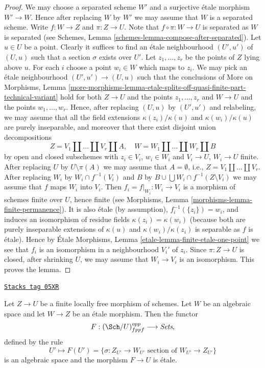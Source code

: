 \begin{proof}
We may choose a separated scheme $W'$ and a surjective \'etale morphism
$W' \to W$. Hence after replacing $W$ by $W'$ we may assume that $W$
is a separated scheme. Write $f : W \to Z$ and $\pi : Z \to U$.
Note that $f \circ \pi : W \to U$ is separated as
$W$ is separated (see
Schemes, Lemma \ref{schemes-lemma-compose-after-separated}).
Let $u \in U$ be a point. Clearly it suffices
to find an \'etale neighbourhood $(U', u')$ of $(U, u)$ such that
a section $\sigma$ exists over $U'$. Let $z_1, \ldots, z_r$
be the points of $Z$ lying above $u$. For each $i$ choose a point
$w_i \in W$ which maps to $z_i$. We may pick an \'etale neighbourhood
$(U', u') \to (U, u)$ such that the conclusions of
More on Morphisms, Lemma
\ref{more-morphisms-lemma-etale-splits-off-quasi-finite-part-technical-variant}
hold for both $Z \to U$ and the points $z_1, \ldots, z_r$
and $W \to U$ and the points $w_1, \ldots, w_r$. Hence, after
replacing $(U, u)$ by $(U', u')$ and relabeling, we may assume that
all the field extensions $\kappa(z_i)/\kappa(u)$ and
$\kappa(w_i)/\kappa(u)$ are purely inseparable, and moreover
that there exist disjoint union decompositions
$$
Z = V_1 \amalg \ldots \amalg V_r \amalg A, \quad
W = W_1 \amalg \ldots \amalg W_r \amalg B
$$
by open and closed subschemes
with $z_i \in V_i$, $w_i \in W_i$ and $V_i \to U$, $W_i \to U$ finite.
After replacing $U$ by $U \setminus \pi(A)$ we may assume that
$A = \emptyset$, i.e., $Z = V_1 \amalg \ldots \amalg V_r$.
After replacing $W_i$ by $W_i \cap f^{-1}(V_i)$ and
$B$ by $B \cup \bigcup W_i \cap f^{-1}(Z \setminus V_i)$
we may assume that $f$ maps $W_i$ into $V_i$.
Then $f_i = f|_{W_i} : W_i \to V_i$ is a morphism of schemes finite over $U$,
hence finite (see
Morphisms, Lemma \ref{morphisms-lemma-finite-permanence}).
It is also \'etale (by assumption),
$f_i^{-1}(\{z_i\}) = w_i$, and induces an isomorphism of residue
fields $\kappa(z_i) = \kappa(w_i)$ (because both are purely inseparable
extensions of $\kappa(u)$ and $\kappa(w_i)/\kappa(z_i)$
is separable as $f$ is \'etale). Hence by
\'Etale Morphisms, Lemma \ref{etale-lemma-finite-etale-one-point}
we see that $f_i$ is an isomorphism in a neighbourhood $V_i'$ of
$z_i$. Since $\pi : Z \to U$ is closed, after shrinking $U$, we may assume
that $W_i \to V_i$ is an isomorphism. This proves the lemma.
\end{proof}

\begin{lemma}
\label{criteria-lemma-space-of-sections}
\href{https://stacks.math.columbia.edu/tag/05XR}{\texttt{Stacks tag 05XR}}

Let $Z \to U$ be a finite locally free morphism of schemes.
Let $W$ be an algebraic space and let $W \to Z$ be an \'etale morphism.
Then the functor
$$
F : (\Sch/U)_{fppf}^{opp} \longrightarrow \textit{Sets},
$$
defined by the rule
$$
U' \longmapsto
F(U') =
\{\sigma : Z_{U'} \to W_{U'}\text{ section of }W_{U'} \to Z_{U'}\}
$$
is an algebraic space and the morphism $F \to U$ is \'etale.
\end{lemma}

